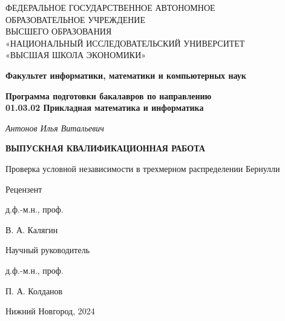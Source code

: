 \thispagestyle{empty}

\begin{center}
    \textsc{
    ФЕДЕРАЛЬНОЕ ГОСУДАРСТВЕННОЕ АВТОНОМНОЕ\\
    ОБРАЗОВАТЕЛЬНОЕ УЧРЕЖДЕНИЕ\\
    ВЫСШЕГО ОБРАЗОВАНИЯ\\
    «НАЦИОНАЛЬНЫЙ ИССЛЕДОВАТЕЛЬСКИЙ УНИВЕРСИТЕТ\\
    «ВЫСШАЯ ШКОЛА ЭКОНОМИКИ»}
\end{center}

\vfill

\begin{center}
    \textbf{Факультет информатики, математики и компьютерных наук}

    \vspace{20pt}

    \textbf{Программа подготовки бакалавров по направлению \\
    01.03.02 Прикладная математика и информатика}
\end{center}

\vfill

\begin{center}
    \textit{Антонов Илья Витальевич} 
    
    \vspace{20pt}
    
    \textbf{ВЫПУСКНАЯ КВАЛИФИКАЦИОННАЯ РАБОТА}

    \vspace{20pt}
    
    Проверка условной независимости в трехмерном распределении Бернулли
\end{center}

\vfill

\begin{minipage}[t]{0.4\textwidth}
    Рецензент 

        \vspace{5pt}
        
    д.ф.-м.н., проф.

    \vspace{5pt}

    В. А. Калягин
\end{minipage}
\hfill
\begin{minipage}[t]{0.4\textwidth}
        \begin{flushright}
    Научный руководитель

        \vspace{5pt}
        
    д.ф.-м.н., проф.

        \vspace{5pt}
        
    П. А. Колданов
        \end{flushright}
\end{minipage}

\vfill

\begin{center}
    Нижний Новгород, 2024
\end{center}